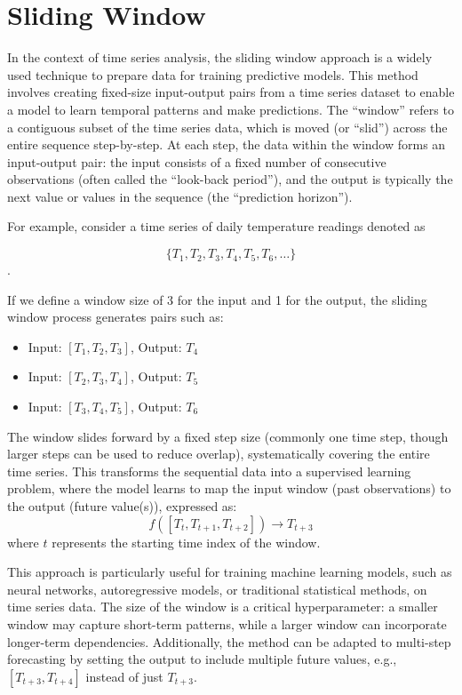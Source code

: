 	\section{Sliding Window}
	In the context of time series analysis, the sliding window approach is a widely used technique to prepare data for training predictive models. This method involves creating fixed-size input-output pairs from a time series dataset to enable a model to learn temporal patterns and make predictions. The ``window'' refers to a contiguous subset of the time series data, which is moved (or ``slid'') across the entire sequence step-by-step. At each step, the data within the window forms an input-output pair: the input consists of a fixed number of consecutive observations (often called the ``look-back period''), and the output is typically the next value or values in the sequence (the ``prediction horizon'').
	
	For example, consider a time series of daily temperature readings denoted as 
	
	\[ \{T_1, T_2, T_3, T_4, T_5, T_6, \dots\} \].
	
	If we define a window size of 3 for the input and 1 for the output, the sliding window process generates pairs such as:
	\begin{itemize}
		\item Input: \( [T_1, T_2, T_3] \), Output: \( T_4 \)
		\item Input: \( [T_2, T_3, T_4] \), Output: \( T_5 \)
		\item Input: \( [T_3, T_4, T_5] \), Output: \( T_6 \)
	\end{itemize}
	The window slides forward by a fixed step size (commonly one time step, though larger steps can be used to reduce overlap), systematically covering the entire time series. This transforms the sequential data into a supervised learning problem, where the model learns to map the input window (past observations) to the output (future value(s)), expressed as:
	\[
	f([T_t, T_{t+1}, T_{t+2}]) \rightarrow T_{t+3}
	\]
	where \( t \) represents the starting time index of the window.
	
	This approach is particularly useful for training machine learning models, such as neural networks, autoregressive models, or traditional statistical methods, on time series data. The size of the window is a critical hyperparameter: a smaller window may capture short-term patterns, while a larger window can incorporate longer-term dependencies. Additionally, the method can be adapted to multi-step forecasting by setting the output to include multiple future values, e.g., \( [T_{t+3}, T_{t+4}] \) instead of just \( T_{t+3} \).
	
